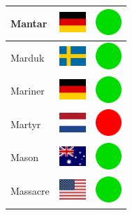 \documentclass[12pt, a4paper, twoside]{report}
\begin{document}
\begin{center}
\begin{longtable}{|p{5cm}|p{2cm}|p{2cm}|}
 Mantar                                                     & \includegraphics[width=1cm]{../4x3/de} &   \includegraphics[width=1cm]{../likes/y} \\ \hline
 Marduk                                                     & \includegraphics[width=1cm]{../4x3/se} &   \includegraphics[width=1cm]{../likes/y} \\ \hline
 Mariner                                                    & \includegraphics[width=1cm]{../4x3/de} &   \includegraphics[width=1cm]{../likes/y} \\ \hline
 Martyr                                                     & \includegraphics[width=1cm]{../4x3/nl} &   \includegraphics[width=1cm]{../likes/n} \\ \hline
 Mason                                                      & \includegraphics[width=1cm]{../4x3/au} &   \includegraphics[width=1cm]{../likes/y} \\ \hline
 Massacre                                                   & \includegraphics[width=1cm]{../4x3/us} &   \includegraphics[width=1cm]{../likes/y} \\ \hline

\end{longtable}
\end{center}
\end{document}
